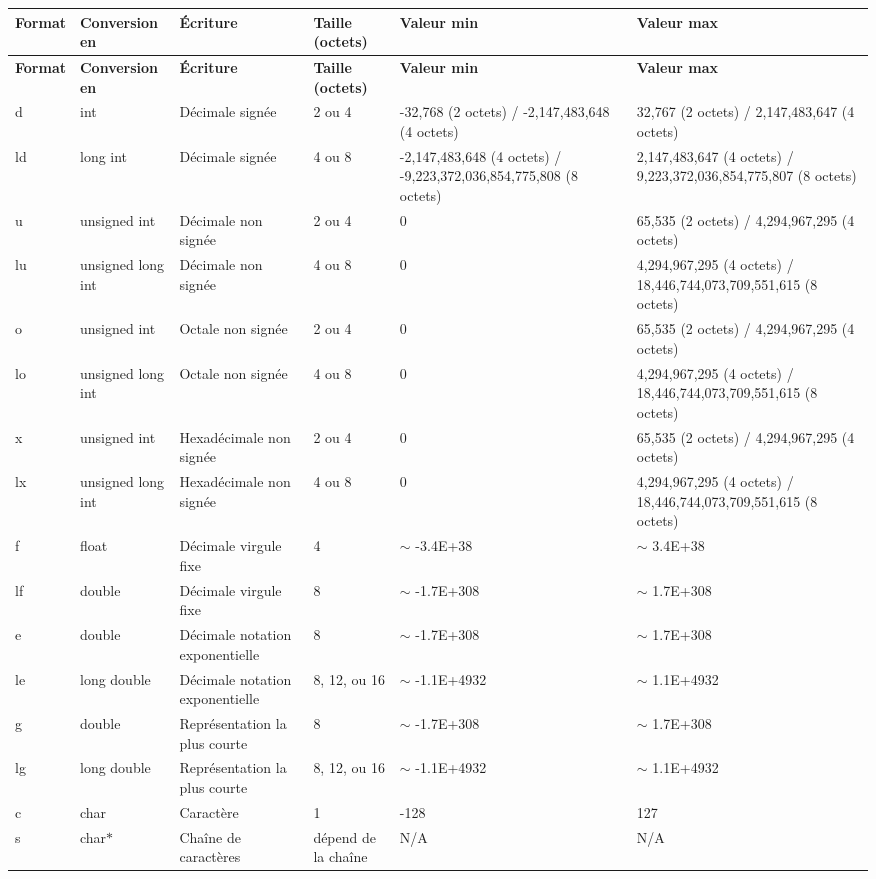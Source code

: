 \tabulinesep=1mm
\begin{longtabu} spread 0pt [c]{*{6}{|X[-1]}|}
\hline
\rowcolor{\tableheadbgcolor}\textbf{ Format }&\textbf{ Conversion en }&\textbf{ Écriture }&\textbf{ Taille (octets) }&\textbf{ Valeur min }&\textbf{ Valeur max  }\\
\endfirsthead
\hline
\endfoot
\hline
\rowcolor{\tableheadbgcolor}\textbf{ Format }&\textbf{ Conversion en }&\textbf{ Écriture }&\textbf{ Taille (octets) }&\textbf{ Valeur min }&\textbf{ Valeur max  }\\
\endhead
d &int &Décimale signée &2 ou 4 &-\/32,768 (2 octets) / -\/2,147,483,648 (4 octets) &32,767 (2 octets) / 2,147,483,647 (4 octets) \\
ld &long int &Décimale signée &4 ou 8 &-\/2,147,483,648 (4 octets) / -\/9,223,372,036,854,775,808 (8 octets) &2,147,483,647 (4 octets) / 9,223,372,036,854,775,807 (8 octets) \\
u &unsigned int &Décimale non signée &2 ou 4 &0 &65,535 (2 octets) / 4,294,967,295 (4 octets) \\
lu &unsigned long int &Décimale non signée &4 ou 8 &0 &4,294,967,295 (4 octets) / 18,446,744,073,709,551,615 (8 octets) \\
o &unsigned int &Octale non signée &2 ou 4 &0 &65,535 (2 octets) / 4,294,967,295 (4 octets) \\
lo &unsigned long int &Octale non signée &4 ou 8 &0 &4,294,967,295 (4 octets) / 18,446,744,073,709,551,615 (8 octets) \\
x &unsigned int &Hexadécimale non signée &2 ou 4 &0 &65,535 (2 octets) / 4,294,967,295 (4 octets) \\
lx &unsigned long int &Hexadécimale non signée &4 ou 8 &0 &4,294,967,295 (4 octets) / 18,446,744,073,709,551,615 (8 octets) \\
f &float &Décimale virgule fixe &4 &$\sim$ -\/3.\+4E+38 &$\sim$ 3.\+4E+38 \\
lf &double &Décimale virgule fixe &8 &$\sim$ -\/1.\+7E+308 &$\sim$ 1.\+7E+308 \\
e &double &Décimale notation exponentielle &8 &$\sim$ -\/1.\+7E+308 &$\sim$ 1.\+7E+308 \\
le &long double &Décimale notation exponentielle &8, 12, ou 16 &$\sim$ -\/1.\+1E+4932 &$\sim$ 1.\+1E+4932 \\
g &double &Représentation la plus courte &8 &$\sim$ -\/1.\+7E+308 &$\sim$ 1.\+7E+308 \\
lg &long double &Représentation la plus courte &8, 12, ou 16 &$\sim$ -\/1.\+1E+4932 &$\sim$ 1.\+1E+4932 \\
c &char &Caractère &1 &-\/128 &127 \\
s &char$\ast$ &Chaîne de caractères &dépend de la chaîne &N/A &N/A \\
\end{longtabu}
